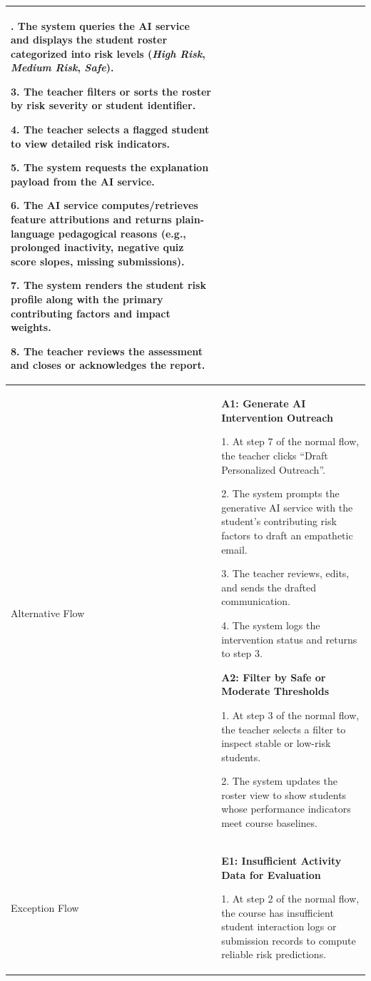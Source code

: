 {\begin{longtable}{|>{\bfseries\raggedright\arraybackslash}p{}|>{\raggedright\arraybackslash}p{}|}
2. The system queries the AI service and displays the student roster categorized into risk levels (\textit{High Risk}, \textit{Medium Risk}, \textit{Safe}). \par
3. The teacher filters or sorts the roster by risk severity or student identifier. \par
4. The teacher selects a flagged student to view detailed risk indicators. \par
5. The system requests the explanation payload from the AI service. \par
6. The AI service computes/retrieves feature attributions and returns plain-language pedagogical reasons (e.g., prolonged inactivity, negative quiz score slopes, missing submissions). \par
7. The system renders the student risk profile along with the primary contributing factors and impact weights. \par
8. The teacher reviews the assessment and closes or acknowledges the report. \\ \hline
Alternative Flow &
\textbf{A1: Generate AI Intervention Outreach} \par
1. At step 7 of the normal flow, the teacher clicks ``Draft Personalized Outreach''. \par
2. The system prompts the generative AI service with the student's contributing risk factors to draft an empathetic email. \par
3. The teacher reviews, edits, and sends the drafted communication. \par
4. The system logs the intervention status and returns to step 3. \par\vspace{4pt}
\textbf{A2: Filter by Safe or Moderate Thresholds} \par
1. At step 3 of the normal flow, the teacher selects a filter to inspect stable or low-risk students. \par
2. The system updates the roster view to show students whose performance indicators meet course baselines. \\ \hline
Exception Flow &
\textbf{E1: Insufficient Activity Data for Evaluation} \par
1. At step 2 of the normal flow, the course has insufficient student interaction logs or submission records to compute reliable risk predictions. \par

\end{longtable}}
